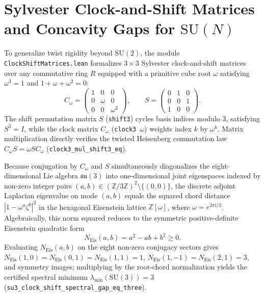 \documentclass[11pt,a4paper]{article}
\newcommand{\Z}{\mathbb{Z}}
\newcommand{\SU}{\mathrm{SU}}
\begin{document}
\section{Sylvester Clock-and-Shift Matrices and Concavity Gaps for $\SU(N)$}
To generalize twist rigidity beyond $\SU(2)$, the module \texttt{ClockShift\-Matrices.lean} formalizes $3 \times 3$ Sylvester clock-and-shift matrices over any commutative ring $R$ equipped with a primitive cube root $\omega$ satisfying $\omega^3 = 1$ and $1 + \omega + \omega^2 = 0$:
\begin{equation}
C_\omega = \begin{pmatrix} 1 & 0 & 0 \\ 0 & \omega & 0 \\ 0 & 0 & \omega^2 \end{pmatrix}, \qquad
S = \begin{pmatrix} 0 & 1 & 0 \\ 0 & 0 & 1 \\ 1 & 0 & 0 \end{pmatrix}.
\end{equation}
The shift permutation matrix $S$ (\texttt{shift3}) cycles basis indices modulo $3$, satisfying $S^3 = I$, while the clock matrix $C_\omega$ (\texttt{clock3 $\omega$}) weights index $k$ by $\omega^k$. Matrix multiplication directly verifies the twisted Heisenberg commutation law $C_\omega S = \omega S C_\omega$ (\texttt{clock3\_\-mul\_\-shift3\_\-eq}).

Because conjugation by $C_\omega$ and $S$ simultaneously diagonalizes the eight-dimensional Lie algebra $\mathfrak{su}(3)$ into one-dimensional joint eigenspaces indexed by non-zero integer pairs $(a, b) \in (\Z/3\Z)^2 \setminus \{(0, 0)\}$, the discrete adjoint Laplacian eigenvalue on mode $(a, b)$ equals the squared chord distance $|1 - \omega^a \zeta^b|^2$ in the hexagonal Eisenstein lattice $\Z[\omega]$, where $\omega = e^{2\pi \mathrm{i}/3}$. Algebraically, this norm squared reduces to the symmetric positive-definite Eisenstein quadratic form
\begin{equation}
N_{\mathrm{Eis}}(a, b) = a^2 - ab + b^2 \ge 0.
\end{equation}
Evaluating $N_{\mathrm{Eis}}(a, b)$ on the eight non-zero conjugacy sectors gives $N_{\mathrm{Eis}}(1, 0) = N_{\mathrm{Eis}}(0, 1) = N_{\mathrm{Eis}}(1, 1) = 1$, $N_{\mathrm{Eis}}(1, -1) = N_{\mathrm{Eis}}(2, 1) = 3$, and symmetry images; multiplying by the root-chord normalization yields the certified spectral minimum $\lambda_{\min}(\SU(3)) = 3$ (\texttt{su3\_\-clock\_\-shift\_\-spectral\_\-gap\_\-eq\_\-three}).
\end{document}
